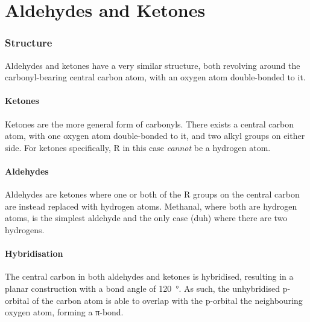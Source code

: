 
\pagebreak
\hypertarget{ChapterAldehydesAndKetones}{}
\part{Aldehydes and Ketones}

	\section{Structure}

		Aldehydes and ketones have a very similar structure, both revolving around the carbonyl-bearing central carbon atom, with an
		oxygen atom double-bonded to it.

		\subsection{Ketones}

			Ketones are the more general form of carbonyls. There exists a central carbon atom, with one oxygen atom double-bonded to it, and
			two alkyl groups on either side. For ketones specifically, R in this case \textit{cannot} be a hydrogen atom.



		\subsection{Aldehydes}

			Aldehydes are ketones where one or both of the R groups on the central carbon are instead replaced with hydrogen atoms. Methanal,
			where both are hydrogen atoms, is the simplest aldehyde and the only case (duh) where there are two hydrogens.



		\pagebreak
		\subsection{Hybridisation}

			The central carbon in both aldehydes and ketones is \sptwo hybridised, resulting in a planar construction with a bond angle
			of \SI{120}{\degree}. As such, the unhybridised p-orbital of the carbon atom is able to overlap with the p-orbital the neighbouring
			oxygen atom, forming a π-bond.


